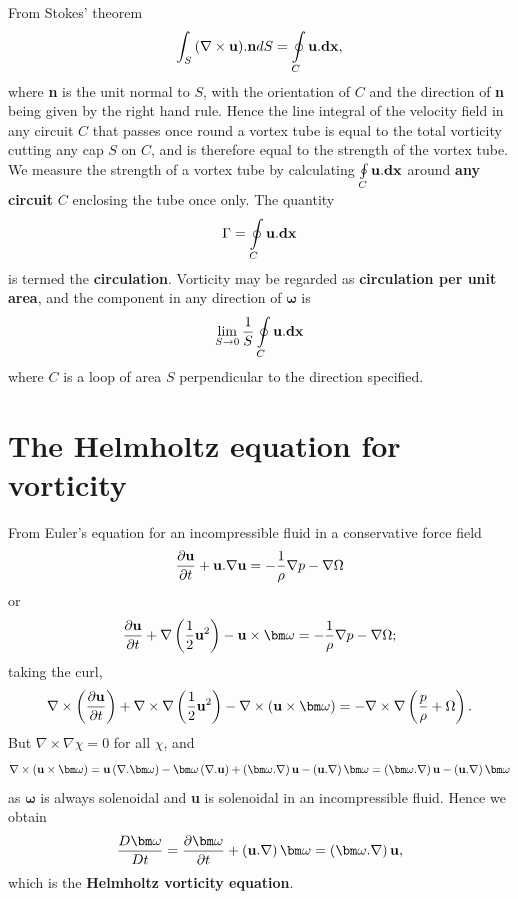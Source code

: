 \documentclass[10pt]{report}
\begin{document}
From Stokes' theorem
\[
\int_S {\left( {\nabla \times {{\bf u}}} \right)} . {{\bf
n}}dS=\oint\limits_C {{{\bf u}}. {{\bf dx}}} ,
\]
where \textbf{n} is the unit normal to $S$, with the orientation of $C$ and the
direction of \textbf{n} being given by the right hand rule. Hence the line
integral of the velocity field in any circuit $C$ that passes once round a
vortex tube is equal to the total vorticity cutting any cap $S$ on $C$, and is
therefore equal to the strength of the vortex tube. We measure the strength
of a vortex tube by calculating $\oint\limits_C {{{\bf u}}. {\rm
{\bf dx}}} $ around \textbf{any circuit } $C$ enclosing the tube once only. The
quantity
\[ \Gamma =\oint\limits_C {{{\bf u}}. {{\bf dx}}} \]
 is termed the \textbf{circulation}. Vorticity may be regarded as
\textbf{circulation per unit area}, and the component in any direction of
${\bm \omega}$ is
\[
\mathop {\lim }\limits_{S\to 0} \frac{1}{S}\oint\limits_C {{{\bf
u}}. {{\bf dx}}}
\]
where $C$ is a loop of area $S$ perpendicular to the direction specified.

\section{The Helmholtz equation for vorticity}
\label{subsec:mylabel1}
From Euler's equation for an incompressible fluid in a conservative force
field
\[
\frac{\partial {{\bf u}}}{\partial t}+{{\bf u}}. \nabla {\rm
{\bf u}}=-\frac{1}{\rho }\nabla p-\nabla \Omega
\]
or
\[ \frac{\partial {{\bf u}}}{\partial t}+\nabla \left( {{1
\over 2}{{\bf u}}^2} \right)-{{\bf u}}\times
{\bm\omega} =-\frac{1}{\rho }\nabla p-\nabla \Omega ; \]
taking the curl,
\[ \nabla \times \left( {\frac{\partial {{\bf
u}}}{\partial t}} \right)+\nabla \times \nabla \left( {{1 \over
2}{{\bf u}}^2} \right)-\nabla \times \left( {{{\bf u}}\times {\bm\omega}}
\right)=-\nabla \times \nabla \left( {\frac{p}{\rho }+\Omega }
\right). \]
But $\nabla \times \nabla \chi =0$ for all $\chi $,
and
\[\nabla \times \left( {{{\bf u}}\times {\bm \omega}} \right)={{\bf
u}}\left( {\nabla . {\bm \omega}} \right)-{\bm \omega}\left( {\nabla . {{\bf u}}}
\right)+\left( {{\bm \omega}. \nabla } \right){{\bf u}}-\left( {{{\bf
u}}. \nabla } \right){\bm \omega}=\left( {{\bm \omega}. \nabla } \right){{\bf
u}}-\left( {{{\bf u}}. \nabla } \right){\bm \omega} \]
as ${\bm \omega}$ is always solenoidal and \textbf{u} is solenoidal in
an incompressible fluid. Hence we obtain
\[
\frac{D{\bm \omega}}{Dt}=\frac{\partial {\bm \omega}}{\partial t}+\left( {{{\bf u}}.
\nabla } \right){\bm \omega}=\left( {{\bm \omega}. \nabla } \right){{\bf u}},
\]
which is the \textbf{Helmholtz vorticity equation}.
\end{document}
